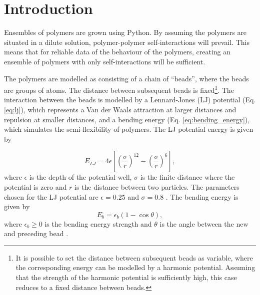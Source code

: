 \section{Introduction}
Ensembles of polymers are grown using Python. By assuming the polymers are situated in a dilute solution, polymer-polymer self-interactions will prevail. This means that for reliable data of the behaviour of the polymers, creating an ensemble of polymers with only self-interactions will be sufficient. 

The polymers are modelled as consisting of a chain of ``beads'', where the beads are groups of atoms. The distance between subsequent beads is fixed\footnote{It is possible to set the distance between subsequent beads as variable, where the corresponding energy can be modelled by a harmonic potential. Assuming that the strength of the harmonic potential is sufficiently high, this case reduces to a fixed distance between beads.}. The interaction between the beads is modelled by a Lennard-Jones (LJ) potential (Eq. \ref{eq:lj}), which represents a Van der Waals attraction at larger distances and repulsion at smaller distances, and a bending energy (Eq. \ref{eq:bending_energy}), which simulates the semi-flexibility of polymers. The LJ potential energy is given by 

\begin{equation}\label{eq:lj}
   E_{LJ} = 4\epsilon \left[ \left(\frac{\sigma}{r}\right)^{12} - \left(\frac{\sigma}{r}\right)^{6} \right],
\end{equation} where $\epsilon$ is the depth of the potential well, $\sigma$ is the finite distance where the potential is zero and $r$ is the distance between two particles. The parameters chosen for the LJ potential are $\epsilon=0.25$ and $\sigma=0.8$ \cite{jmt}. The bending energy is given by
\begin{equation}\label{eq:bending_energy}
    E_{b} = \epsilon_b(1-\cos{\theta}),
\end{equation} where $\epsilon_b\geq 0$ is the bending energy strength and $\theta$ is the angle between the new and preceding bead \cite{hsu2011review}.


